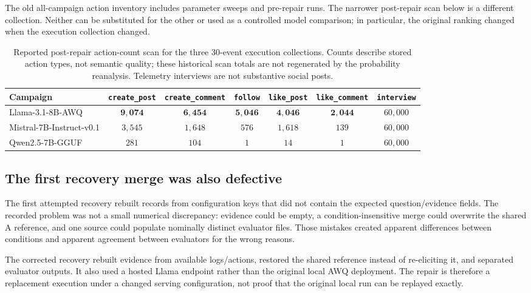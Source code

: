 The old all-campaign action inventory includes parameter sweeps and pre-repair runs. The narrower post-repair scan below is a different collection. Neither can be substituted for the other or used as a controlled model comparison; in particular, the original ranking changed when the execution collection changed.
\begin{table}[!htbp]
\centering
\caption{Reported post-repair action-count scan for the three 30-event execution collections. Counts describe stored action types, not semantic quality; these historical scan totals are not regenerated by the probability reanalysis. Telemetry interviews are not substantive social posts.}
\label{tab:action_30event_only}
\small
\begin{tabular}{lcccccc}
\toprule
\textbf{Campaign} & \texttt{create\_post} & \texttt{create\_comment} & \texttt{follow} & \texttt{like\_post} & \texttt{like\_comment} & \texttt{interview} \\
\midrule
Llama-3.1-8B-AWQ         & $\mathbf{9{,}074}$ & $\mathbf{6{,}454}$ & $\mathbf{5{,}046}$ & $\mathbf{4{,}046}$ & $\mathbf{2{,}044}$ & $60{,}000$ \\
Mistral-7B-Instruct-v0.1 & $3{,}545$ & $1{,}648$ & $576$ & $1{,}618$ & $139$ & $60{,}000$ \\
Qwen2.5-7B-GGUF          & $281$ & $104$ & $1$ & $14$ & $1$ & $60{,}000$ \\
\bottomrule
\end{tabular}
\setlength{\tabcolsep}{6pt}
\end{table}

\subsection{The first recovery merge was also defective}
The first attempted recovery rebuilt records from configuration keys that did not contain the expected question/evidence fields. The recorded problem was not a small numerical discrepancy: evidence could be empty, a condition-insensitive merge could overwrite the shared A reference, and one source could populate nominally distinct evaluator files. Those mistakes created apparent differences between conditions and apparent agreement between evaluators for the wrong reasons.

The corrected recovery rebuilt evidence from available logs/actions, restored the shared reference instead of re-eliciting it, and separated evaluator outputs. It also used a hosted Llama endpoint rather than the original local AWQ deployment. The repair is therefore a replacement execution under a changed serving configuration, not proof that the original local run can be replayed exactly.

